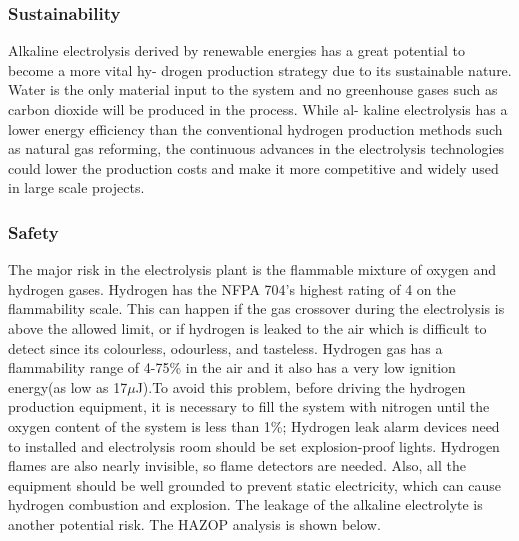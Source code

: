 \subsubsection{Sustainability}
Alkaline electrolysis derived by renewable energies has a great potential to become a more vital hy- drogen production strategy due to its sustainable nature. Water is the only material input to the system and no greenhouse gases such as carbon dioxide will be produced in the process. While al- kaline electrolysis has a lower energy efficiency than the conventional hydrogen production methods such as natural gas reforming, the continuous advances in the electrolysis technologies could lower the production costs and make it more competitive and widely used in large scale projects.
\subsubsection{Safety}
The major risk in the electrolysis plant is the flammable mixture of oxygen and hydrogen gases.
Hydrogen has the NFPA 704's highest rating of 4 on the flammability scale. \cite{safety} This can happen if the gas crossover during the electrolysis is above the allowed limit, or if hydrogen is leaked to the air which is difficult to detect since its colourless, odourless, and tasteless. Hydrogen gas has a flammability range of 4-75\% in the air and it also has a very low ignition energy(as low as 17$\mu$J).To avoid this problem, 
before driving the hydrogen production equipment, it is necessary to fill the system with nitrogen until the oxygen content of the system is less than 1\%; Hydrogen leak alarm devices need to installed and electrolysis room should be set explosion-proof lights. Hydrogen flames are also nearly invisible, so flame detectors are needed. Also, all the equipment should be well grounded to prevent static electricity, which can cause hydrogen combustion and explosion. The leakage of the alkaline electrolyte is another potential risk. The HAZOP analysis is shown below.


